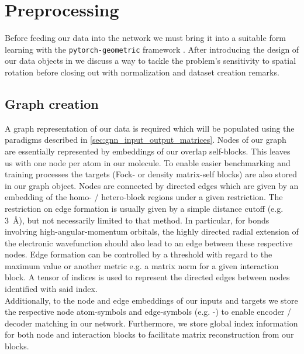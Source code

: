 \section{Preprocessing}
\label{sec:gnn_preproc}
Before feeding our data into the network we must bring it into a suitable form learning with the \texttt{pytorch-geometric} framework \parencite{ref:PyTorchGeometric, ref:PyTorch_geom_paper}. After introducing the design of our data objects in we discuss a way to tackle the problem's sensitivity to spatial rotation before closing out with normalization and dataset creation remarks. 
\subsection{Graph creation}
\label{subsec:gnn_graph_creation}
A graph representation of our data is required which will be populated using the paradigms described in \autoref{sec:gnn_input_output_matrices}. Nodes of our graph are essentially represented by embeddings of our overlap self-blocks. This leaves us with one node per atom in our molecule. To enable easier benchmarking and training processes the targets (Fock- or density matrix-self blocks) are also stored in our graph object. Nodes are connected by directed edges which are given by an embedding of the homo- / hetero-block regions under a given restriction. The restriction on edge formation is usually given by a simple distance cutoff (e.g. \SI{3}{\angstrom}), but not necessarily limited to that method. In particular, for bonds involving high-angular-momentum orbitals, the highly directed radial extension of the electronic wavefunction should also lead to an edge between these respective nodes. Edge formation can be controlled by a threshold with regard to the maximum value or another metric e.g. a matrix norm for a given interaction block. A tensor of indices is used to represent the directed edges between nodes identified with said index.\\

Additionally, to the node and edge embeddings of our inputs and targets we store the respective node atom-symbols and edge-symbols (e.g. -) to enable encoder / decoder matching in our network. Furthermore, we store global index information for both node and interaction blocks to facilitate matrix reconstruction from our blocks. 

